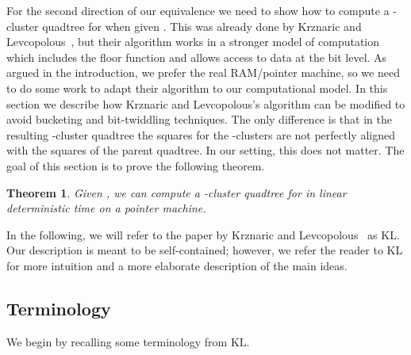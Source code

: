 \documentclass[11pt]{paper}
\newtheorem {theorem} {Theorem}[section]
\begin{document}
    For the second direction of our equivalence we need to show
    how to compute a -cluster quadtree for  when given
    . This was already done
    by Krznaric and Levcopolous~\cite{KrznaricLe95,KrznaricLe98},
    but their algorithm works in a stronger model of
    computation which includes the floor function and allows access to data
    at the bit level.
    As argued in the introduction, we prefer the real RAM/pointer machine,
    so we need to do some work to adapt their
    algorithm to our computational model.
    In this section we describe how Krznaric and Levcopolous's
    algorithm can be modified to avoid bucketing and bit-twiddling techniques.
    The only difference is that in the resulting -cluster
    quadtree the squares for the -clusters are not perfectly
    aligned with the squares of the parent quadtree. In our setting,
    this does not matter. The goal of this section is to prove the following
    theorem.

\begin{theorem}\label{thm:dt->c-cluster-qt}
Given , we can compute a -cluster quadtree
for  in linear deterministic time on a pointer machine.
\end{theorem}

In the following, we will refer to the paper by Krznaric and
Levcopolous~\cite{KrznaricLe98} as KL.
Our description is meant to be self-contained; however, we refer the reader to KL for more intuition and a more elaborate description of the main ideas.

\subsection{Terminology}
We begin by recalling some terminology from KL.
\end{document}
